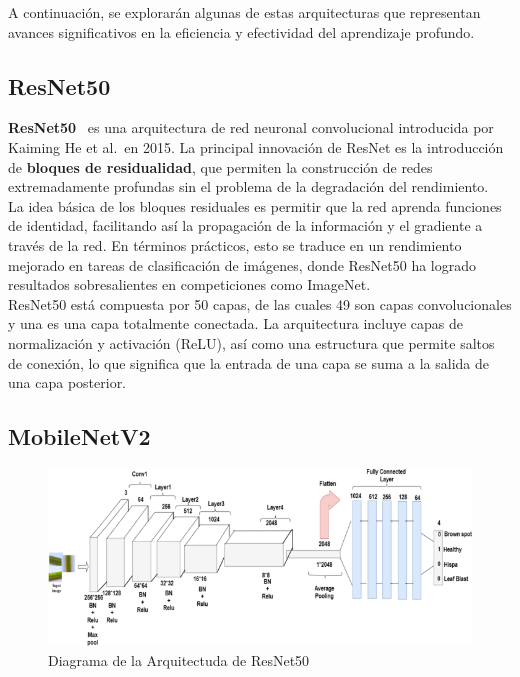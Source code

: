 A continuación, se explorarán algunas de estas arquitecturas que representan avances significativos en la eficiencia y
efectividad del aprendizaje profundo.

\subsection{ResNet50}\label{subsec:resnet50}
\textbf{ResNet50}~\cite{resnet} es una arquitectura de red neuronal convolucional introducida por Kaiming He et al.\ en 2015.
La principal innovación de ResNet es la introducción de \textbf{bloques de residualidad}, que permiten la construcción
de redes extremadamente profundas sin el problema de la degradación del rendimiento. \\[6pt]

La idea básica de los bloques residuales es permitir que la red aprenda funciones de identidad, facilitando así la
propagación de la información y el gradiente a través de la red.
En términos prácticos, esto se traduce en un rendimiento mejorado en tareas de clasificación de imágenes, donde
ResNet50 ha logrado resultados sobresalientes en competiciones como ImageNet. \\[6pt]

ResNet50 está compuesta por 50 capas, de las cuales 49 son capas convolucionales y una es una capa totalmente conectada.
La arquitectura incluye capas de normalización y activación (ReLU), así como una estructura que permite saltos de
conexión, lo que significa que la entrada de una capa se suma a la salida de una capa posterior.

\subsection{MobileNetV2}\label{subsec:mobilenet}

\begin{figure}[htp] \label{fig:resnet50}
    \begin{center}
        \includegraphics[width=1\textwidth]{imagenes/resnet50}
    \end{center}
    \caption[ResNet50]{Diagrama de la Arquitectuda de ResNet50}
\end{figure}

